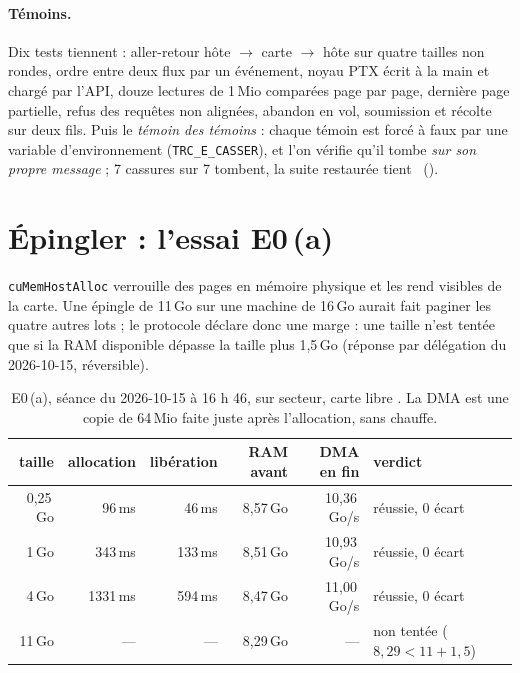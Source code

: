 \paragraph{Témoins.} Dix tests tiennent : aller-retour hôte $\to$ carte $\to$ hôte sur quatre tailles non rondes, ordre entre deux flux par un événement, noyau PTX écrit à la main et chargé par l'API, douze lectures de 1\,Mio comparées page par page, dernière page partielle, refus des requêtes non alignées, abandon en vol, soumission et récolte sur deux fils. Puis le \emph{témoin des témoins} : chaque témoin est forcé à faux par une variable d'environnement (\texttt{TRC\_E\_CASSER}), et l'on vérifie qu'il tombe \emph{sur son propre message} ; 7 cassures sur 7 tombent, la suite restaurée tient \mes~().

\section{Épingler : l'essai E0\,(a)}\label{sec:t2c-epingler}

\texttt{cuMemHostAlloc} verrouille des pages en mémoire physique et les rend visibles de la carte. Une épingle de 11\,Go sur une machine de 16\,Go aurait fait paginer les quatre autres lots ; le protocole déclare donc une marge : une taille n'est tentée que si la RAM disponible dépasse la taille plus 1,5\,Go (réponse par délégation du 2026-10-15, réversible).

\begin{table}[ht]
\centering\small
\caption[E0\,(a) : épingler de 0,25 à 4\,Go]{E0\,(a), séance du 2026-10-15 à 16 h 46, sur secteur, carte libre \mes. La DMA est une copie de 64\,Mio faite juste après l'allocation, sans chauffe.}
\label{tab:t2c-epingler}
\begin{tabular}{@{}rrrrrl@{}}
\toprule
taille & allocation & libération & RAM avant & DMA en fin & verdict \\
\midrule
0,25\,Go & 96\,ms & 46\,ms & 8,57\,Go & 10,36\,Go/s & réussie, 0 écart \\
1\,Go & 343\,ms & 133\,ms & 8,51\,Go & 10,93\,Go/s & réussie, 0 écart \\
4\,Go & \num{1331}\,ms & 594\,ms & 8,47\,Go & 11,00\,Go/s & réussie, 0 écart \\
11\,Go & — & — & 8,29\,Go & — & non tentée ($8{,}29 < 11 + 1{,}5$) \\
\bottomrule
\end{tabular}
\end{table}

